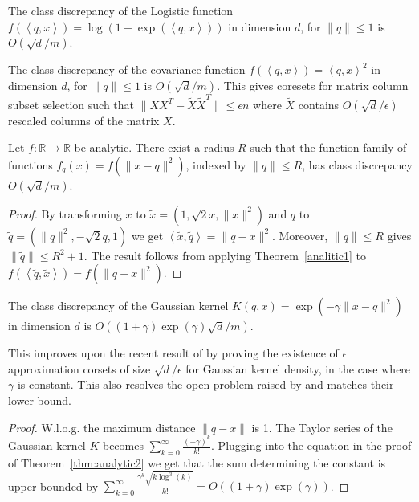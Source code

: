 \documentclass[anon,12pt]{colt2019} %
\newcommand{\ip}[1]{\left \langle #1 \right \rangle}
\newcommand{\R}{\mathbb{R}}
\newcommand{\eps}{\epsilon}
\begin{document}
{\begin{corollary}
The class discrepancy of the Logistic function $f(\ip{q,x}) = \log(1+\exp(\ip{q,x}))$ in dimension $d$, for $\|q\| \leq 1$ is $O(\sqrt{d}/m)$.
\end{corollary}

\begin{corollary}
The class discrepancy of the covariance function $f(\ip{q,x}) = \ip{q,x}^2$ in dimension $d$, for $\|q\| \leq 1$ is $O(\sqrt{d}/m)$. This gives coresets for matrix column subset selection such that $\|XX^T - \tilde X \tilde X^T\| \le \eps n$ where $\tilde X$ contains $O(\sqrt{d}/\eps)$ rescaled columns of the matrix $X$.
\end{corollary}



\begin{theorem} \label{thm:analytic2}
Let $f:\R\rightarrow\R$ be analytic. There exist a radius $R$ such that the function family of functions $f_q(x) = f(\|x-q\|^2)$, indexed by $\|q\| \leq R$, has class discrepancy $O(\sqrt{d}/m)$. 
\end{theorem}
\begin{proof}
By transforming $x$ to $\tilde{x} = (1, \sqrt{2}x, \|x\|^2)$ and $q$ to $\tilde{q} = (\|q\|^2, -\sqrt{2}q, 1)$ we get $\ip{\tilde{x},\tilde{q}} = \|q-x\|^2$. Moreover, $\|q\| \le R$ gives $\|\tilde q\| \le R^2+1$. The result follows from applying Theorem~\ref{analitic1} to $f(\ip{ \tilde q, \tilde x}) = f(\|q-x\|^2)$.
\end{proof}

\begin{corollary}
The class discrepancy of the Gaussian kernel $K(q,x) = \exp(-\gamma \|x-q\|^2)$ in dimension $d$ is $O((1+\gamma)\exp(\gamma)\sqrt{d}/m)$.
\end{corollary} 
This improves upon the recent result of \cite{DBLP:journals/corr/abs-1802-01751} by proving the existence of $\eps$ approximation corsets of size $\sqrt{d}/\eps$ for Gaussian kernel density, in the case where $\gamma$ is constant. 
This also resolves the open problem raised by \cite{DBLP:journals/corr/abs-1802-01751} and matches their lower bound.   

\begin{proof}
W.l.o.g. the maximum distance $\|q-x\|$ is 1. The Taylor series of the Gaussian kernel $K$ becomes
$ \sum_{k=0}^\infty \frac{(-\gamma)^k}{k!} $.
Plugging into the equation in the proof of Theorem~\ref{thm:analytic2} we get that the sum determining the constant is upper bounded by
$ \sum_{k=0}^\infty \frac{\gamma^{k}\sqrt{ k\log^3(k)}}{k!} = O\left((1+\gamma) \exp(\gamma)\right)$.
\end{proof}


}
\end{document}
